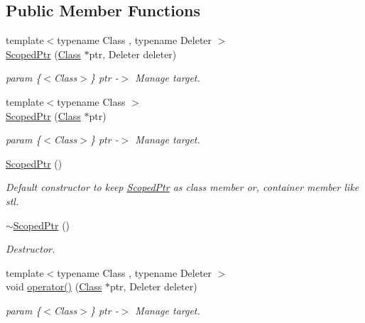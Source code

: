 \subsection*{Public Member Functions}
\begin{DoxyCompactItemize}
\item 
{\footnotesize template$<$typename Class , typename Deleter $>$ }\\\hyperlink{classmocha_1_1_scoped_ptr_abb0ff40374f253fce8b83d646c11f241}{ScopedPtr} (\hyperlink{classmocha_1_1_class}{Class} $\ast$ptr, Deleter deleter)
\begin{DoxyCompactList}\small\item\em param \{$<$Class$>$\} ptr -\/$>$ Manage target. \end{DoxyCompactList}\item 
{\footnotesize template$<$typename Class $>$ }\\\hyperlink{classmocha_1_1_scoped_ptr_a315cc5eddedccb04b4a01e65cc86adf8}{ScopedPtr} (\hyperlink{classmocha_1_1_class}{Class} $\ast$ptr)
\begin{DoxyCompactList}\small\item\em param \{$<$Class$>$\} ptr -\/$>$ Manage target. \end{DoxyCompactList}\item 
\hyperlink{classmocha_1_1_scoped_ptr_a471d0a7779a8f6a4fd7fbbb004211152}{ScopedPtr} ()
\begin{DoxyCompactList}\small\item\em Default constructor to keep \hyperlink{classmocha_1_1_scoped_ptr}{ScopedPtr} as class member or, container member like stl. \end{DoxyCompactList}\item 
\hyperlink{classmocha_1_1_scoped_ptr_aa597ec5d80bc53440cf78fa991a1bf0d}{$\sim$ScopedPtr} ()
\begin{DoxyCompactList}\small\item\em Destructor. \end{DoxyCompactList}\item 
{\footnotesize template$<$typename Class , typename Deleter $>$ }\\void \hyperlink{classmocha_1_1_scoped_ptr_af59533e5d9a5960f4eb26688b11a4a23}{operator()} (\hyperlink{classmocha_1_1_class}{Class} $\ast$ptr, Deleter deleter)
\begin{DoxyCompactList}\small\item\em param \{$<$Class$>$\} ptr -\/$>$ Manage target. \end{DoxyCompactList}\item 

\end{DoxyCompactItemize}

